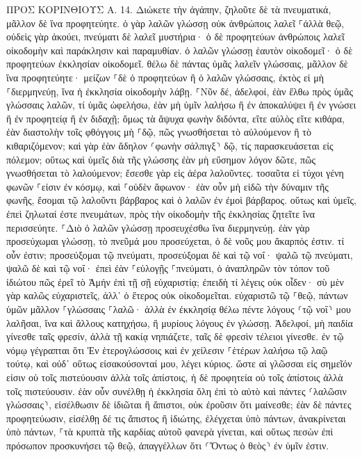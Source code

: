 \documentclass[twoside, 9pt]{extreport}
\begin{document}
ΠΡΟΣ ΚΟΡΙΝΘΙΟΥΣ Α.
14.
Διώκετε τὴν ἀγάπην, ζηλοῦτε δὲ τὰ πνευματικά, μᾶλλον δὲ ἵνα προφητεύητε. 
ὁ γὰρ λαλῶν γλώσσῃ οὐκ ἀνθρώποις λαλεῖ ⸀ἀλλὰ θεῷ, οὐδεὶς γὰρ ἀκούει, πνεύματι δὲ λαλεῖ μυστήρια· 
ὁ δὲ προφητεύων ἀνθρώποις λαλεῖ οἰκοδομὴν καὶ παράκλησιν καὶ παραμυθίαν. 
ὁ λαλῶν γλώσσῃ ἑαυτὸν οἰκοδομεῖ· ὁ δὲ προφητεύων ἐκκλησίαν οἰκοδομεῖ. 
θέλω δὲ πάντας ὑμᾶς λαλεῖν γλώσσαις, μᾶλλον δὲ ἵνα προφητεύητε· μείζων ⸀δὲ ὁ προφητεύων ἢ ὁ λαλῶν γλώσσαις, ἐκτὸς εἰ μὴ ⸀διερμηνεύῃ, ἵνα ἡ ἐκκλησία οἰκοδομὴν λάβῃ. 
⸀Νῦν δέ, ἀδελφοί, ἐὰν ἔλθω πρὸς ὑμᾶς γλώσσαις λαλῶν, τί ὑμᾶς ὠφελήσω, ἐὰν μὴ ὑμῖν λαλήσω ἢ ἐν ἀποκαλύψει ἢ ἐν γνώσει ἢ ἐν προφητείᾳ ἢ ἐν διδαχῇ; 
ὅμως τὰ ἄψυχα φωνὴν διδόντα, εἴτε αὐλὸς εἴτε κιθάρα, ἐὰν διαστολὴν τοῖς φθόγγοις μὴ ⸀δῷ, πῶς γνωσθήσεται τὸ αὐλούμενον ἢ τὸ κιθαριζόμενον; 
καὶ γὰρ ἐὰν ἄδηλον ⸂φωνὴν σάλπιγξ⸃ δῷ, τίς παρασκευάσεται εἰς πόλεμον; 
οὕτως καὶ ὑμεῖς διὰ τῆς γλώσσης ἐὰν μὴ εὔσημον λόγον δῶτε, πῶς γνωσθήσεται τὸ λαλούμενον; ἔσεσθε γὰρ εἰς ἀέρα λαλοῦντες. 
τοσαῦτα εἰ τύχοι γένη φωνῶν ⸀εἰσιν ἐν κόσμῳ, καὶ ⸀οὐδὲν ἄφωνον· 
ἐὰν οὖν μὴ εἰδῶ τὴν δύναμιν τῆς φωνῆς, ἔσομαι τῷ λαλοῦντι βάρβαρος καὶ ὁ λαλῶν ἐν ἐμοὶ βάρβαρος. 
οὕτως καὶ ὑμεῖς, ἐπεὶ ζηλωταί ἐστε πνευμάτων, πρὸς τὴν οἰκοδομὴν τῆς ἐκκλησίας ζητεῖτε ἵνα περισσεύητε. 
⸀Διὸ ὁ λαλῶν γλώσσῃ προσευχέσθω ἵνα διερμηνεύῃ. 
ἐὰν γὰρ προσεύχωμαι γλώσσῃ, τὸ πνεῦμά μου προσεύχεται, ὁ δὲ νοῦς μου ἄκαρπός ἐστιν. 
τί οὖν ἐστιν; προσεύξομαι τῷ πνεύματι, προσεύξομαι δὲ καὶ τῷ νοΐ· ψαλῶ τῷ πνεύματι, ψαλῶ δὲ καὶ τῷ νοΐ· 
ἐπεὶ ἐὰν ⸀εὐλογῇς ⸀πνεύματι, ὁ ἀναπληρῶν τὸν τόπον τοῦ ἰδιώτου πῶς ἐρεῖ τὸ Ἀμήν ἐπὶ τῇ σῇ εὐχαριστίᾳ; ἐπειδὴ τί λέγεις οὐκ οἶδεν· 
σὺ μὲν γὰρ καλῶς εὐχαριστεῖς, ἀλλ᾽ ὁ ἕτερος οὐκ οἰκοδομεῖται. 
εὐχαριστῶ τῷ ⸀θεῷ, πάντων ὑμῶν μᾶλλον ⸀γλώσσαις ⸀λαλῶ· 
ἀλλὰ ἐν ἐκκλησίᾳ θέλω πέντε λόγους ⸂τῷ νοΐ⸃ μου λαλῆσαι, ἵνα καὶ ἄλλους κατηχήσω, ἢ μυρίους λόγους ἐν γλώσσῃ. 
Ἀδελφοί, μὴ παιδία γίνεσθε ταῖς φρεσίν, ἀλλὰ τῇ κακίᾳ νηπιάζετε, ταῖς δὲ φρεσὶν τέλειοι γίνεσθε. 
ἐν τῷ νόμῳ γέγραπται ὅτι Ἐν ἑτερογλώσσοις καὶ ἐν χείλεσιν ⸀ἑτέρων λαλήσω τῷ λαῷ τούτῳ, καὶ οὐδ᾽ οὕτως εἰσακούσονταί μου, λέγει κύριος. 
ὥστε αἱ γλῶσσαι εἰς σημεῖόν εἰσιν οὐ τοῖς πιστεύουσιν ἀλλὰ τοῖς ἀπίστοις, ἡ δὲ προφητεία οὐ τοῖς ἀπίστοις ἀλλὰ τοῖς πιστεύουσιν. 
ἐὰν οὖν συνέλθῃ ἡ ἐκκλησία ὅλη ἐπὶ τὸ αὐτὸ καὶ πάντες ⸂λαλῶσιν γλώσσαις⸃, εἰσέλθωσιν δὲ ἰδιῶται ἢ ἄπιστοι, οὐκ ἐροῦσιν ὅτι μαίνεσθε; 
ἐὰν δὲ πάντες προφητεύωσιν, εἰσέλθῃ δέ τις ἄπιστος ἢ ἰδιώτης, ἐλέγχεται ὑπὸ πάντων, ἀνακρίνεται ὑπὸ πάντων, 
⸀τὰ κρυπτὰ τῆς καρδίας αὐτοῦ φανερὰ γίνεται, καὶ οὕτως πεσὼν ἐπὶ πρόσωπον προσκυνήσει τῷ θεῷ, ἀπαγγέλλων ὅτι ⸂Ὄντως ὁ θεὸς⸃ ἐν ὑμῖν ἐστιν. 
\end{document}
